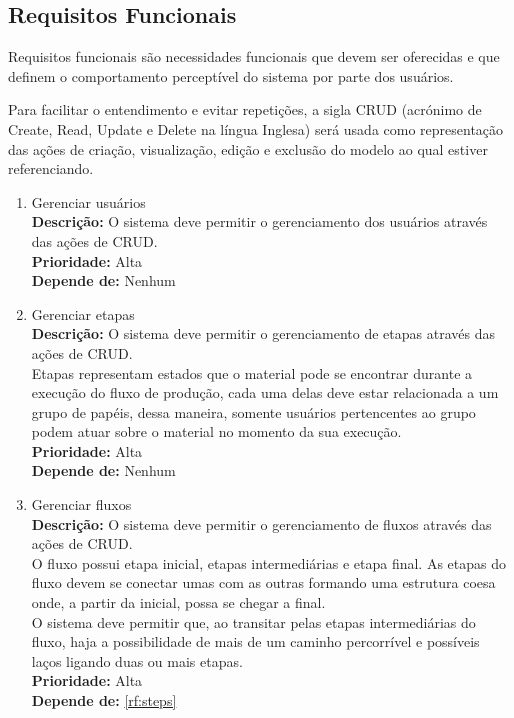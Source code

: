 \subsection{Requisitos Funcionais} \label{subsec:requisitos_funcionais}
		
Requisitos funcionais são necessidades funcionais que devem ser oferecidas e que definem o comportamento perceptível do sistema por parte dos usuários.		

Para facilitar o entendimento e evitar repetições, a sigla CRUD (acrónimo de Create, Read, Update e Delete na língua Inglesa) será usada como representação das ações de criação, visualização, edição e exclusão do modelo ao qual estiver referenciando.

\begin{enumerate}[label=\textbf{RF\protect\twodigits{\theenumi}}, leftmargin=2cm]

	\item \label{rf:users} Gerenciar usuários \\
		\textbf{Descrição:} O sistema deve permitir o gerenciamento dos usuários através das ações de CRUD. \\
		\textbf{Prioridade:} Alta \\
		\textbf{Depende de:} Nenhum

	\item \label{rf:steps} Gerenciar etapas \\
		\textbf{Descrição:} O sistema deve permitir o gerenciamento de etapas através das ações de CRUD. \\
		Etapas representam estados que o material pode se encontrar durante a execução do fluxo de produção, cada uma delas deve estar relacionada a um grupo de papéis, dessa maneira, somente usuários pertencentes ao grupo podem atuar sobre o material no momento da sua execução. \\
		\textbf{Prioridade:} Alta \\
		\textbf{Depende de:} Nenhum

	\item \label{rf:flows} Gerenciar fluxos \\
		\textbf{Descrição:} O sistema deve permitir o gerenciamento de fluxos através das ações de CRUD. \\
		O fluxo possui etapa inicial, etapas intermediárias e etapa final. As etapas do fluxo devem se conectar umas com as outras formando uma estrutura coesa onde, a partir da inicial, possa se chegar a final. \\
		O sistema deve permitir que, ao transitar pelas etapas intermediárias do fluxo, haja a possibilidade de mais de um caminho percorrível e possíveis laços ligando duas ou mais etapas. \\
		\textbf{Prioridade:} Alta \\
		\textbf{Depende de:} \hyperref[rf:steps]{\ref{rf:steps}}


\end{enumerate}
